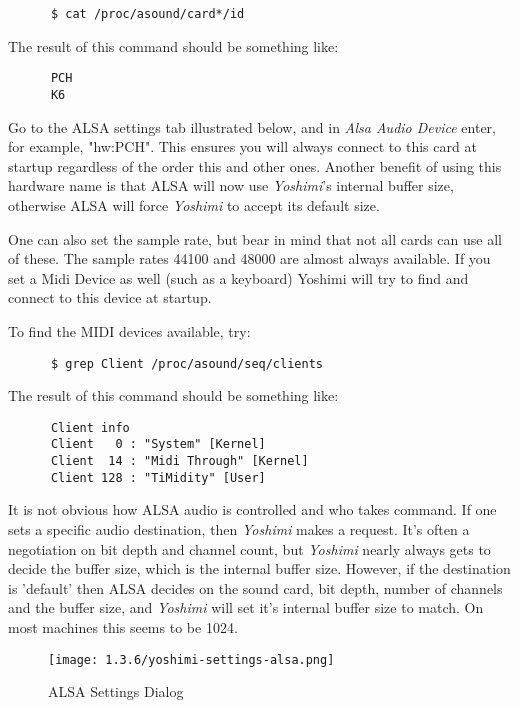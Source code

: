    \begin{verbatim}
      $ cat /proc/asound/card*/id
   \end{verbatim}

   The result of this command should be something like:

   \begin{verbatim}
      PCH
      K6
   \end{verbatim}

   Go to the ALSA settings tab illustrated below, and in 
   \textsl{Alsa Audio Device} enter, for example, "hw:PCH".
   This ensures you will always connect to this card at startup regardless of
   the order this and other ones.  Another benefit of using this hardware name
   is that ALSA will now use \textsl{Yoshimi}'s internal
   buffer size, otherwise ALSA will force \textsl{Yoshimi} to accept its
   default size.

   One can also set the sample rate, but bear in mind that not all cards can use
   all of these.  The sample rates 44100 and 48000 are almost always available.
   If you set a Midi Device as well (such as a keyboard) Yoshimi will try to
   find and connect to this device at startup.

   To find the MIDI devices available, try:

   \begin{verbatim}
      $ grep Client /proc/asound/seq/clients
   \end{verbatim}

   The result of this command should be something like:

   \begin{verbatim}
      Client info
      Client   0 : "System" [Kernel]
      Client  14 : "Midi Through" [Kernel]
      Client 128 : "TiMidity" [User]
   \end{verbatim}

   It is not obvious how ALSA audio is controlled and who takes command.  If one
   sets a specific audio destination, then \textsl{Yoshimi} makes a request.
   It's often a negotiation on bit depth and channel count, but \textsl{Yoshimi}
   nearly always gets to decide the buffer size, which is the internal buffer
   size.  However, if the destination is 'default' then ALSA decides on the
   sound card, bit depth, number of channels and the buffer size, and
   \textsl{Yoshimi} will set it's internal buffer size to match.  On most
   machines this seems to be 1024.

\begin{figure}[H]
   \centering 
   \texttt{[image: 1.3.6/yoshimi-settings-alsa.png]}
   \caption[ALSA Settings]{ALSA Settings Dialog}
   \label{fig:yoshimi_settings_alsa}
\end{figure}

